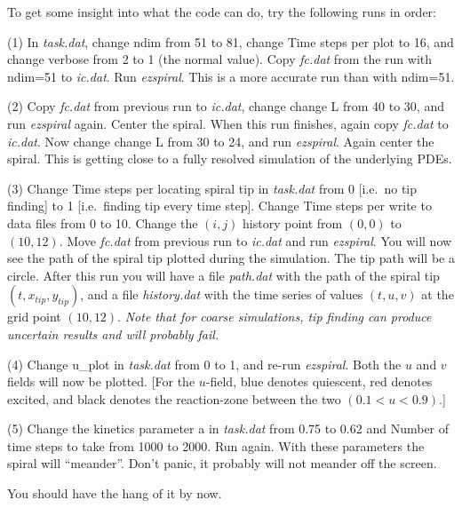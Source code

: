 To get some insight into what the code can do, try the following runs
in order:
\begin{list}{dummy}
{\partopsep=-10pt\parsep=-10pt\itemsep=12pt}

\item[(1)] 
In {\em task.dat}, change {\sf ndim} from 51 to 81, change {\sf Time
steps per plot} to 16, and change {\sf verbose} from 2 to 1 (the normal
value). Copy {\em fc.dat} from the run with {\sf ndim}=51 to {\em
ic.dat}. Run {\em ezspiral}.  This is a more accurate run than with
{\sf ndim}=51.

\item[(2)] 
Copy {\em fc.dat} from previous run to {\em ic.dat}, change change {\sf L}
from 40 to 30, and run {\em ezspiral} again. Center the spiral. When
this run finishes, again copy {\em fc.dat} to {\em ic.dat}. Now change
change {\sf L} from 30 to 24, and run {\em ezspiral}. Again center the
spiral.  This is getting close to a fully resolved simulation of the
underlying PDEs.

\item[(3)] 
Change {\sf Time steps per locating spiral tip} in {\em task.dat} from
0 [i.e.~no tip finding] to 1 [i.e.~finding tip every time
step]. Change {\sf Time steps per write to data files} from 0 to
10. Change the $(i,j)$ {\sf history point} from $(0,0)$ to
$(10,12)$. Move {\em fc.dat} from previous run to {\em ic.dat} and run
{\em ezspiral}. You will now see the path of the spiral tip plotted
during the simulation. The tip path will be a circle.  After this run
you will have a file {\em path.dat} with the path of the spiral tip
$(t, x_{tip}, y_{tip})$, and a file {\em history.dat} with the time 
series of values $(t,u,v)$
at the grid point $(10,12)$. {\em Note that for coarse simulations,
tip finding can produce uncertain results and will probably fail.}

\item[(4)] 
Change {\sf u\_plot} in {\em task.dat} from 0 to 1, and re-run {\em
ezspiral}. Both the $u$ and $v$ fields will now be plotted. [For the
$u$-field, blue denotes quiescent, red denotes excited, and black
denotes the reaction-zone between the two $(0.1<u<0.9)$.]  

\item[(5)] 
Change the kinetics parameter {\sf a} in {\em task.dat} from 0.75 to
0.62 and {\sf Number of time steps to take} from 1000 to 2000.
Run again. With these parameters the spiral will ``meander''.
Don't panic, it probably will not meander off the screen.

\end{list}
You should have the hang of it by now.

